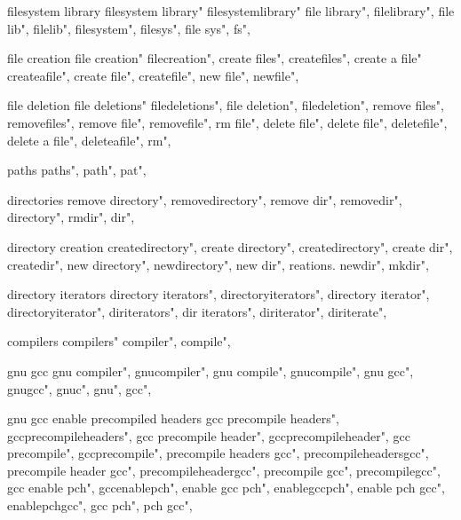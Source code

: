          filesystem library
        filesystem library"
        filesystemlibrary"
        file library",
        filelibrary",
        file lib", 
        filelib",
        filesystem",
        filesys",
        file sys",
        fs",
         
         file creation 
        file creation"
        filecreation",
        create files",
        createfiles", 
        create a file"
        createafile",
        create file", 
        createfile",
        new file", 
        newfile", 
        
         file deletion 
        file deletions"
        filedeletions",
        file deletion",
        filedeletion", 
        remove files", 
        removefiles",
        remove file",
        removefile",
        rm file",
        delete file",
        delete file",
        deletefile",
        delete a file",
        deleteafile",
        rm",
        
         paths 
        paths", 
        path", 
        pat",
        
         directories
        remove directory",
        removedirectory",
        remove dir",
        removedir",
        directory",
        rmdir",
        dir",

         directory creation
        createdirectory",  
        create directory",  
        createdirectory",  
        create dir",  
        createdir",  
        new directory",  
        newdirectory",  
        new dir", reations. 
        newdir",  
        mkdir",  
        
         directory iterators 
        directory iterators",  
        directoryiterators",  
        directory iterator",  
        directoryiterator",  
        diriterators",  
        dir iterators",  
        diriterator",  
        diriterate",  
        
         compilers 
        compilers"
        compiler",
        compile",
        
         gnu gcc
        gnu compiler",
        gnucompiler",
        gnu compile",
        gnucompile",
        gnu gcc",
        gnugcc",
        gnuc",
        gnu",
        gcc",
        
         gnu gcc enable precompiled headers
        gcc precompile headers",  
        gccprecompileheaders",  
        gcc precompile header",  
        gccprecompileheader",  
        gcc precompile",  
        gccprecompile",  
        precompile headers gcc",  
        precompileheadersgcc",  
        precompile header gcc",  
        precompileheadergcc",  
        precompile gcc",  
        precompilegcc",  
        gcc enable pch",  
        gccenablepch",  
        enable gcc pch",  
        enablegccpch",  
        enable pch gcc",  
        enablepchgcc",  
        gcc pch",  
        pch gcc",  
        
